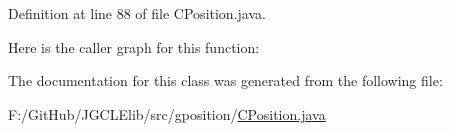 Definition at line 88 of file C\-Position.\-java.



Here is the caller graph for this function\-:




The documentation for this class was generated from the following file\-:\begin{DoxyCompactItemize}
\item 
F\-:/\-Git\-Hub/\-J\-G\-C\-L\-Elib/src/gposition/\hyperlink{_c_position_8java}{C\-Position.\-java}\end{DoxyCompactItemize}
